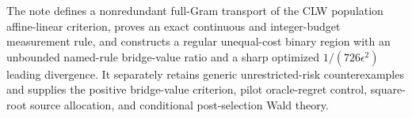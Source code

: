 The note defines a nonredundant full-Gram transport of the CLW population affine-linear criterion, proves an exact continuous and integer-budget measurement rule, and constructs a regular unequal-cost binary region with an unbounded named-rule bridge-value ratio and a sharp optimized \(1/(726\epsilon^2)\) leading divergence. It separately retains generic unrestricted-risk counterexamples and supplies the positive bridge-value criterion, pilot oracle-regret control, square-root source allocation, and conditional post-selection Wald theory.